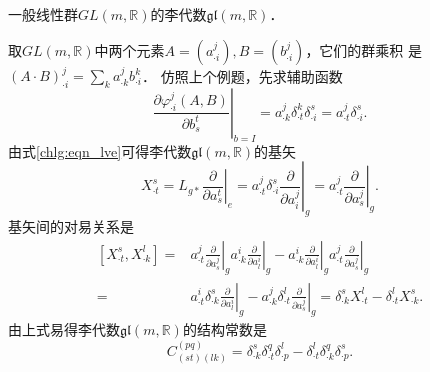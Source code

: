 \begin{example}\label{chlg:exam_GL-la}
    一般线性群$GL(m,\mathbb{R})$的李代数$\mathfrak{gl}(m,\mathbb{R})$．
\end{example}
取$GL(m,\mathbb{R})$中两个元素$A=(a^j_{\cdot i}), B=(b^j_{\cdot i})$，它们的群乘积
是$(A\cdot B)^{j}_{\cdot i} = \sum_{k} a^j_{\cdot k} b^k_{\cdot i}$．
仿照上个例题，先求辅助函数
\begin{equation}
    \left. \frac{\partial \varphi^{j}_{\cdot i} (A,B)}{\partial b_{s}^t}\right|_{b=I} = 
    a^j_{\cdot k} \delta^k_{\cdot t} \delta^s_{\cdot i}=a^j_{\cdot t} \delta^s_{\cdot i}.
\end{equation}
由式\eqref{chlg:eqn_lve}可得李代数$\mathfrak{gl}(m,\mathbb{R})$的基矢
\begin{equation}
    X_{\cdot t}^s=L_{g*} \left.\frac{\partial }{\partial a_{s}^t}\right|_{e} 
    =a^j_{\cdot t} \delta^s_{\cdot i} \left.\frac{\partial }{\partial a_{i}^j}\right|_{g}
    =a^j_{\cdot t} \left.\frac{\partial }{\partial a_{s}^j}\right|_{g} .
\end{equation}
基矢间的对易关系是
\begin{equation}
\begin{aligned}
    [X_{\cdot t}^s, X_{\cdot k}^l]=&a^j_{\cdot t} \left.\frac{\partial }{\partial a_{s}^j}\right|_{g}
      a^i_{\cdot k} \left.\frac{\partial }{\partial a_{l}^i}\right|_{g}
    - a^i_{\cdot k} \left.\frac{\partial }{\partial a_{l}^i}\right|_{g}
      a^j_{\cdot t} \left.\frac{\partial }{\partial a_{s}^j}\right|_{g} \\
    =&a^i_{\cdot t} \delta^s_{\cdot k} \left.\frac{\partial }{\partial a_{l}^i}\right|_{g}
    - a^j_{\cdot k} \delta^l_{\cdot t} \left.\frac{\partial }{\partial a_{s}^j}\right|_{g} 
    =\delta^s_{\cdot k} X^l_{\cdot t} -\delta^l_{\cdot t} X^s_{\cdot k} .
\end{aligned}\end{equation}
由上式易得李代数$\mathfrak{gl}(m,\mathbb{R})$的结构常数是
\begin{equation}\label{chlg:eqn_gl-sc}
    C^{(pq)}_{(st)(lk)}= \delta^s_{\cdot k} \delta^q_{\cdot t} \delta^l_{\cdot p}
      -\delta^l_{\cdot t} \delta^q_{\cdot k} \delta^s_{\cdot p} .
\end{equation}




